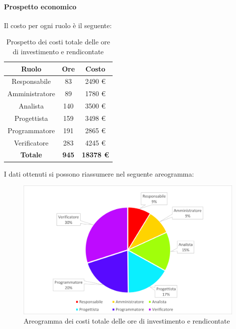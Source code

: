 \paragraph{Prospetto economico}
Il costo per ogni ruolo è il seguente:
\begin{table}[H]
		\begin{center}
			\setlength{\aboverulesep}{0pt}
			\setlength{\belowrulesep}{0pt}
			\setlength{\extrarowheight}{.75ex}
			\begin{tabular}{ c c c }
				\rowcolor{AzzurroGruppo!30} 
				\textbf{Ruolo} & \textbf{Ore} & \textbf{Costo}  \\
				\toprule
				Responsabile   & 83 & 2490 \euro \\
				Amministratore & 89 & 1780 \euro \\
				Analista       & 140 & 3500 \euro \\
				Progettista    & 159 & 3498 \euro \\
				Programmatore  & 191 & 2865 \euro \\
				Verificatore   & 283 & 4245 \euro \\
				\textbf{Totale} & \textbf{945} & \textbf{18378 \euro} \\
				\bottomrule
			\end{tabular}
			\caption{ Prospetto dei costi totale delle ore di investimento e rendicontate}
		\end{center}
	\end{table}
I dati ottenuti si possono riassumere nel seguente areogramma:
\begin{figure}[H]
    \centering
    \includegraphics[scale = 0.5]{components/img/Totale-non-rendicontate-torta.png}
    \caption{ Areogramma dei costi totale delle ore di investimento e rendicontate}
    \label{fig:Areogramma ripartizione ore totali di investimento e rendicontate}
\end{figure}
